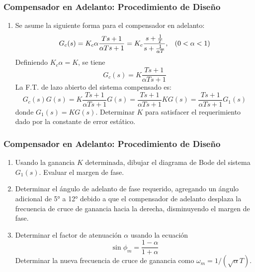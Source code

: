 \documentclass[aspectratio=169]{beamer}
\theoremstyle{definition}
\theoremstyle{plain}
\theoremstyle{remark}
\newcounter{saveenumi}
\newcommand{\seti}{\setcounter{saveenumi}{\value{enumi}}}
\newcommand{\conti}{\setcounter{enumi}{\value{saveenumi}}}
\begin{document}
\begin{frame}[<+->]\frametitle{Compensador en Adelanto: Procedimiento de Diseño}
	\begin{enumerate}
		\item Se asume la siguiente forma para el compensador en adelanto:
		\begin{equation*}
			G_c(s) = K_c \alpha \frac{Ts+1}{\alpha Ts+1} = K_c \frac{s+\frac{1}{T}}{s+\frac{1}{\alpha T}}, \hspace*{3mm} (0 < \alpha < 1)
		\end{equation*}
		\pause
		Definiendo $K_c \alpha = K$, se tiene
		\begin{equation*}
			G_c(s) = K \frac{Ts+1}{\alpha Ts+1}
		\end{equation*}
		\pause
		La F.T. de lazo abierto del sistema compensado es:
		\begin{equation*}
			G_c(s)G(s) = K \frac{Ts+1}{\alpha Ts+1}G(s) = \frac{Ts+1}{\alpha Ts+1} KG(s) = \frac{Ts+1}{\alpha Ts+1} G_1(s)
		\end{equation*}
		donde $G_1(s) = KG(s)$.
		\pause
		Determinar $K$ para satisfacer el requerimiento dado por la constante de error estático.
		\seti
	\end{enumerate}
\end{frame}

\begin{frame}[<+->]\frametitle{Compensador en Adelanto: Procedimiento de Diseño}
	\begin{enumerate}
		\conti
		\item Usando la ganancia $K$ determinada, dibujar el diagrama de Bode del sistema $G_1(s)$. Evaluar el margen de fase.
		\item Determinar el ángulo de adelanto de fase requerido, agregando un ángulo adicional de \ang{5} a \ang{12} debido a que el compensador de adelanto desplaza la frecuencia de cruce de ganancia hacia la derecha, disminuyendo el margen de fase.
		\item Determinar el factor de atenuación $\alpha$ usando la ecuación
		\begin{equation*}
			\sin \phi_m = \frac{1-\alpha}{1+\alpha}
		\end{equation*}
		Determinar la nueva frecuencia de cruce de ganancia como $\omega_m = 1/(\sqrt{\alpha}T)$.
		\seti
	\end{enumerate}
\end{frame}
\end{document}
